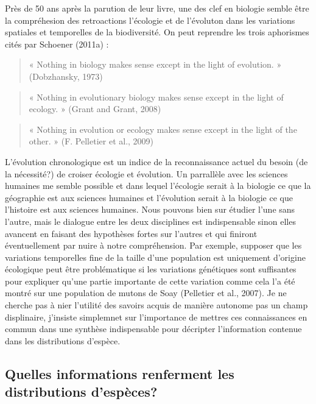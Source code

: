 Près de 50 ans après la parution de leur livre, une des clef en biologie
semble être la compréhesion des retroactions l'écologie et de l'évoluton
dans les variations spatiales et temporelles de la biodiversité. On peut
reprendre les trois aphorismes cités par Schoener (2011a) :

\begin{quote}
« Nothing in biology makes sense except in the light of evolution. »
(Dobzhansky, 1973)
\end{quote}

\begin{quote}
« Nothing in evolutionary biology makes sense except in the light of
ecology. » (Grant and Grant, 2008)
\end{quote}

\begin{quote}
« Nothing in evolution or ecology makes sense except in the light of the
other. » (F. Pelletier et al., 2009)
\end{quote}

L'évolution chronologique est un indice de la reconnaissance actuel du
besoin (de la nécessité?) de croiser écologie et évolution. Un
parrallèle avec les sciences humaines me semble possible et dans lequel
l'écologie serait à la biologie ce que la géographie est aux sciences
humaines et l'évolution serait à la biologie ce que l'histoire est aux
sciences humaines. Nous pouvons bien sur étudier l'une sans l'autre,
mais le dialogue entre les deux disciplines est indispensable sinon
elles avancent en faisant des hypothèses fortes sur l'autres et qui
finiront éventuellement par nuire à notre compréhension. Par exemple,
supposer que les variations temporelles fine de la taille d'une
population est uniquement d'origine écologique peut être problématique
si les variations génétiques sont suffisantes pour expliquer qu'une
partie importante de cette variation comme cela l'a été montré sur une
population de mutons de Soay (Pelletier et al., 2007). Je ne cherche pas
à nier l'utilité des savoirs acquis de manière autonome pas un champ
displinaire, j'insiste simplemnet sur l'importance de mettres ces
connaissances en commun dans une synthèse indispensable pour décripter
l'information contenue dans les distributions d'espèce.

\subsection*{Quelles informations renferment les distributions
d'espèces?}\label{quelles-informations-renferment-les-distributions-despuxe8ces}

